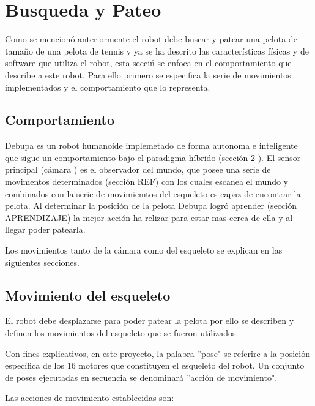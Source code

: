 \label{chapter:busqueda}
\section{Busqueda y Pateo}
Como se mencion\'o anteriormente el robot debe buscar y patear una pelota de tamaño de una pelota de tennis y ya se ha descrito las caracter\'isticas f\'isicas y de software que utiliza el robot, esta secci\'n se enfoca en el comportamiento que describe a este robot.
 Para ello primero se especifica la serie de movimientos implementados y el comportamiento que lo representa.

\subsection{Comportamiento}

Debupa es un robot humanoide implemetado de forma autonoma e inteligente que sigue un comportamiento bajo el paradigma h\'ibrido (secci\'on 2 ). El sensor principal (c\'amara ) es el observador del mundo, que posee una serie de movimentos determinados (secci\'on REF) con los cuales escanea el mundo y combinados con la serie de movimiemtos del esqueleto es capaz de encontrar la pelota. Al determinar la posici\'on de la pelota Debupa logr\'o aprender (secci\'on APRENDIZAJE) la mejor acci\'on ha relizar para estar mas cerca de ella y al llegar poder patearla.

Los movimientos tanto de la c\'amara como del esqueleto se explican en las siguientes secciones.  

\subsection{Movimiento del esqueleto}
\label{esqueleto}
El robot debe desplazarse para poder patear la pelota por ello se describen y definen los movimientos del esqueleto que se fueron utilizados.

Con fines explicativos, en este proyecto, la palabra ''pose" se referire a la posición específica de los 16 motores que constituyen el esqueleto del robot. Un conjunto de poses ejecutadas en secuencia se denominará ''acción de movimiento".


Las acciones de movimiento establecidas son:


